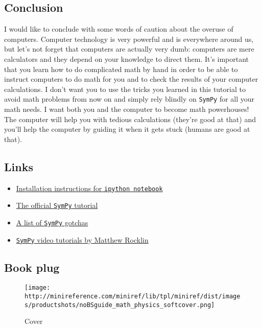 \documentclass{article}
\begin{document}
    \subsection{Conclusion}\label{conclusion}

    I would like to conclude with some words of caution about the overuse of
computers. Computer technology is very powerful and is everywhere around
us, but let's not forget that computers are actually very dumb:
computers are mere calculators and they depend on your knowledge to
direct them. It's important that you learn how to do complicated math by
hand in order to be able to instruct computers to do math for you and to
check the results of your computer calculations. I don't want you to use
the tricks you learned in this tutorial to avoid math problems from now
on and simply rely blindly on \texttt{SymPy} for all your math needs. I
want both you and the computer to become math powerhouses! The computer
will help you with tedious calculations (they're good at that) and
you'll help the computer by guiding it when it gets stuck (humans are
good at that).

    \subsection{Links}\label{links}

    \begin{itemize}
\itemsep1pt\parskip0pt
\item
  \href{http://ipython.org/install.html}{Installation instructions for
  \texttt{ipython notebook}}
\item
  \href{http://docs.sympy.org/latest/tutorial/intro.html}{The official
  \texttt{SymPy} tutorial}
\item
  \href{http://docs.sympy.org/dev/gotchas.html}{A list of \texttt{SymPy}
  gotchas}
\item
  \href{http://pyvideo.org/speaker/583/matthew-rocklin}{\texttt{SymPy}
  video tutorials by Matthew Rocklin}
\end{itemize}

    \subsection{Book plug}\label{book-plug}

    \begin{figure}[htbp]
\centering
\texttt{[image: http://minireference.com/miniref/lib/tpl/miniref/dist/images/productshots/noBSguide\_math\_physics\_softcover.png]}
\caption{Cover}
\end{figure}
\end{document}
